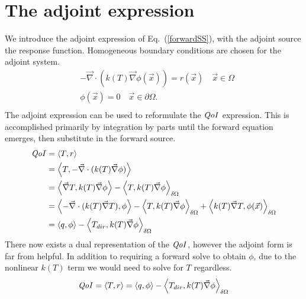 \documentclass{article}
\newcommand{\vx}{\vec{x}}
\newcommand{\bra}{\left\langle}
\newcommand{\ket}{\right\rangle}
\newcommand{\ketbd}{\right\rangle_{\delta \Omega}}
\renewcommand{\div}{\vec{\nabla} \cdot}
\newcommand{\grad}{\vec{\nabla}}
\newcommand{\qoi}{{\it QoI}\xspace}
\newcommand{\Tdir}{T_{dir}}
\begin{document}
\section{The adjoint expression}
We introduce the adjoint expression of Eq.~(\ref{forwardSS}), with the adjoint source the response function. Homogeneous boundary conditions are chosen for the adjoint system.
\begin{equation}
\label{adjointSS}
\begin{split}
& - \div ( k(T) \grad \phi (\vx) ) = r(\vx) \quad \vx \in \Omega \\
&\phi(\vx)=0 \quad \vx \in \partial \Omega .\\
\end{split}
\end{equation}
The adjoint expression can be used to reformulate the $\qoi$ expression. This is accomplished primarily by integration by parts until the forward equation emerges, then substitute in the forward source.
\begin{equation}
\label{qoidirv}
\begin{split}
\qoi &= \bra T , r \ket \\
&= \bra T , - \div ( k(T) \grad \phi ) \ket \\
&= \bra  \grad T ,  k(T) \grad \phi   \ket  - \bra T, k(T) \grad \phi  \ketbd\\
&= \bra - \div ( k(T) \grad T ), \phi   \ket  - \bra T, k(T) \grad \phi  \ketbd + \bra k(T) \grad T , \phi (\vx) \ketbd\\
&= \bra q , \phi   \ket  - \bra \Tdir, k(T) \grad \phi  \ketbd \\
\end{split}
\end{equation}
There now exists a dual representation of the $\qoi$, however the adjoint form is far from helpful. In addition to requiring a forward solve to obtain $\phi$, due to the nonlinear $k(T)$ term we would need to solve for $T$ regardless.
\begin{equation}
\qoi  = \bra T , r \ket = \bra q , \phi   \ket  - \bra \Tdir, k(T) \grad \phi  \ketbd
\end{equation}
\end{document}
